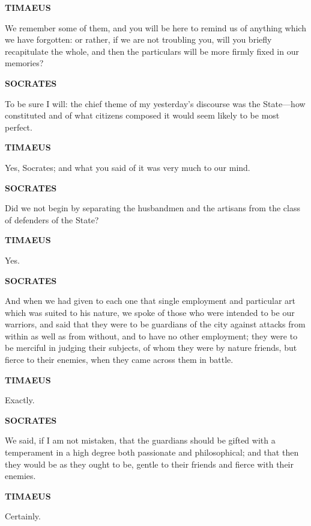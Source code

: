 \documentclass[11pt,letter]{article}
\begin{document}
\par \textbf{TIMAEUS}
\par   We remember some of them, and you will be here to remind us of anything which we have forgotten:  or rather, if we are not troubling you, will you briefly recapitulate the whole, and then the particulars will be more firmly fixed in our memories?

\par \textbf{SOCRATES}
\par   To be sure I will:  the chief theme of my yesterday’s discourse was the State—how constituted and of what citizens composed it would seem likely to be most perfect.

\par \textbf{TIMAEUS}
\par   Yes, Socrates; and what you said of it was very much to our mind.

\par \textbf{SOCRATES}
\par   Did we not begin by separating the husbandmen and the artisans from the class of defenders of the State?

\par \textbf{TIMAEUS}
\par   Yes.

\par \textbf{SOCRATES}
\par   And when we had given to each one that single employment and particular art which was suited to his nature, we spoke of those who were intended to be our warriors, and said that they were to be guardians of the city against attacks from within as well as from without, and to have no other employment; they were to be merciful in judging their subjects, of whom they were by nature friends, but fierce to their enemies, when they came across them in battle.

\par \textbf{TIMAEUS}
\par   Exactly.

\par \textbf{SOCRATES}
\par   We said, if I am not mistaken, that the guardians should be gifted with a temperament in a high degree both passionate and philosophical; and that then they would be as they ought to be, gentle to their friends and fierce with their enemies.

\par \textbf{TIMAEUS}
\par   Certainly.
\end{document}
